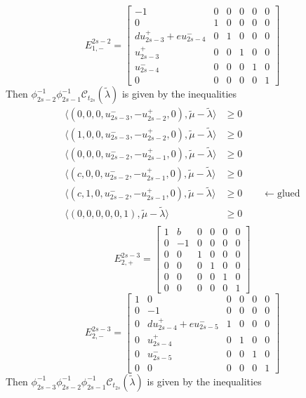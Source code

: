 \documentclass{amsart}
\numberwithin{theorem}{section}
\newcommand{\cC}{\mathcal{C}}
\begin{document}
  \[E^{2s-2}_{1,-}=\left[\begin{array}{cccccc} -1 & 0 & 0 & 0 & 0 & 0 \\ 0 & 1 & 0 & 0 & 0 & 0\\ du_{2s-3}^+ + eu_{2s-4}^- & 0 & 1 & 0 & 0 & 0\\ u_{2s-3}^+ & 0 & 0 & 1 & 0 & 0\\ u_{2s-4}^- & 0 & 0 & 0 & 1 & 0\\ 0 & 0 & 0 & 0 & 0 &  1\end{array}\right]\]
  Then $\phi_{2s-2}^{-1}\phi_{2s-1}^{-1}\cC_{t_{2s}}(\tilde\lambda)$ is given by the inequalities
  \begin{align*}
    \langle (0,0,0,u_{2s-3}^-,-u_{2s-2}^+,0), \tilde\mu - \tilde\lambda\rangle &\ge 0\\ 
    \langle (1,0,0,u_{2s-3}^-,-u_{2s-2}^+,0), \tilde\mu - \tilde\lambda\rangle &\ge 0\\ 
    \langle (0,0,0,u_{2s-2}^-,-u_{2s-1}^+,0), \tilde\mu - \tilde\lambda\rangle &\ge 0\\ 
    \langle (c,0,0,u_{2s-2}^-,-u_{2s-1}^+,0), \tilde\mu - \tilde\lambda\rangle &\ge 0\\ 
    \langle (c,1,0,u_{2s-2}^-,-u_{2s-1}^+,0), \tilde\mu - \tilde\lambda\rangle &\ge 0 \qquad \leftarrow \text{glued}\\ 
    \langle (0,0,0,0,0,1), \tilde\mu - \tilde\lambda\rangle &\ge 0\\ 
  \end{align*}
  \[E^{2s-3}_{2,+}=\left[\begin{array}{cccccc} 1 & b & 0 & 0 & 0 & 0 \\ 0 & -1 & 0 & 0 & 0 & 0\\ 0 & 0 & 1 & 0 & 0 & 0\\ 0 & 0 & 0 & 1 & 0 & 0\\ 0 & 0 & 0 & 0 & 1 & 0\\ 0 & 0 & 0 & 0 & 0 &  1\end{array}\right]\]
  \[E^{2s-3}_{2,-}=\left[\begin{array}{cccccc} 1 & 0 & 0 & 0 & 0 & 0 \\ 0 & -1 & 0 & 0 & 0 & 0\\ 0 & du_{2s-4}^+ + eu_{2s-5}^-  & 1 & 0 & 0 & 0\\ 0 & u_{2s-4}^+ & 0 & 1 & 0 & 0\\ 0 & u_{2s-5}^- & 0 & 0 & 1 & 0\\ 0 & 0 & 0 & 0 & 0 &  1\end{array}\right]\]
  Then $\phi_{2s-3}^{-1}\phi_{2s-2}^{-1}\phi_{2s-1}^{-1}\cC_{t_{2s}}(\tilde\lambda)$ is given by the inequalities
\end{document}
